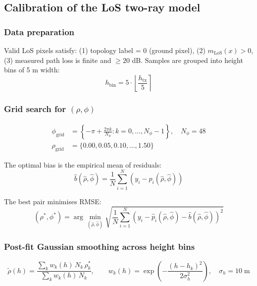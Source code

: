 \subsection{Calibration of the LoS two-ray model}
\label{sec:los_calibration_detail}

\subsubsection{Data preparation}

Valid LoS pixels satisfy: (1) topology label = 0 (ground pixel), (2) $m_{\mathrm{LoS}}(x) > 0$, (3) measured path loss is finite and $\ge 20$ dB. Samples are grouped into height bins of 5 m width:
\begin{equation}
h_{\mathrm{bin}} = 5 \cdot \left\lfloor \frac{h_{\mathrm{tx}}}{5} \right\rceil
\end{equation}

\subsubsection{Grid search for $(\rho, \phi)$}

\begin{align}
\phi_{\mathrm{grid}} &= \left\{-\pi + \frac{2\pi k}{N_\phi} : k = 0,\ldots, N_\phi - 1\right\},\quad N_\phi = 48 \label{eq:phi_grid}\\
\rho_{\mathrm{grid}} &= \{0.00, 0.05, 0.10, \ldots, 1.50\} \label{eq:rho_grid}
\end{align}

The optimal bias is the empirical mean of residuals:
\begin{equation}
\hat b(\hat\rho, \hat\phi) = \frac{1}{N}\sum_{i=1}^{N}\left(y_i - \hat p_i(\hat\rho, \hat\phi)\right)
\end{equation}

The best pair minimises RMSE:
\begin{equation}
(\rho^*, \phi^*) = \arg\min_{(\hat\rho, \hat\phi)} \sqrt{\frac{1}{N}\sum_{i=1}^{N}\left(y_i - \hat p_i(\hat\rho,\hat\phi) - \hat b(\hat\rho,\hat\phi)\right)^2}
\label{eq:rmse_grid}
\end{equation}

\subsubsection{Post-fit Gaussian smoothing across height bins}

\begin{equation}
\tilde\rho(h) = \frac{\sum_k w_k(h)\,N_k\,\rho_k^*}{\sum_k w_k(h)\,N_k},\qquad w_k(h) = \exp\!\left(-\frac{(h - h_k)^2}{2\sigma_h^2}\right),\quad \sigma_h = 10\;\mathrm{m}
\label{eq:gauss_smooth}
\end{equation}


